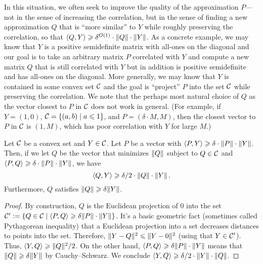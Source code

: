 In this situation, we often seek to improve the quality of the approximation $P$---not in the sense of increasing the correlation, but in the sense of finding a new approximation $Q$ that is ``more similar'' to $Y$ while roughly preserving the correlation, so that $\langle Q,Y\rangle\geqslant \delta^{O(1)}\cdot \lVert Q\rVert\cdot \lVert Y\rVert$.
As a concrete example, we may know that $Y$ is a positive semidefinite matrix with all-ones on the diagonal and our goal is to take an arbitrary matrix $P$ correlated with $Y$ and compute a new matrix $Q$ that is still correlated with $Y$ but in addition is positive semidefinite and has all-ones on the diagonal.
More generally, we may know that $Y$ is contained in some convex set $\mathcal C$ and the goal is ``project'' $P$ into the set $\mathcal C$ while preserving the correlation.
We note that the perhaps  most natural choice of $Q$ as the vector closest to $P$ in $\mathcal C$ does not work in general.
(For example, if $Y=(1,0)$, $\mathcal C=\{(a,b)\mid a\leqslant 1\}$, and $P=(\delta\cdot M, M)$, then the closest vector to $P$ in $\mathcal C$ is $(1,M)$, which has poor correlation with $Y$ for large $M$.)

\begin{theorem}
  \label{thm:correlation-preserving-projection}
  Let $\mathcal C$ be a convex set and $Y\in \mathcal C$.
  Let $P$ be a vector with $\langle P,Y\rangle\geqslant \delta \cdot \lVert P\rVert\cdot \lVert Y\rVert$.
  Then, if we let $Q$ be the vector that minimizes $\lVert Q\rVert$ subject to $Q\in \mathcal C$ and $\langle P,Q\rangle\geqslant \delta \cdot \lVert P\rVert\cdot \lVert Y\rVert$, we have
  \begin{equation}
    \langle Q,Y\rangle\geqslant \delta/2 \cdot \lVert Q\rVert\cdot \lVert Y\rVert\,.
  \end{equation}
  Furthermore, $Q$ satisfies $\lVert Q\rVert\geqslant \delta \lVert Y\rVert$.
\end{theorem}
\begin{proof}
  By construction, $Q$ is the Euclidean projection of $0$ into the set $\mathcal C'\mathrel{\mathop:}= \{Q \in \mathcal C \mid \langle P,Q\rangle\geqslant \delta \lVert P\rVert\cdot \lVert Y\rVert\}$.
  It's a basic geometric fact (sometimes called Pythagorean inequality) that a Euclidean projection into a set decreases distances to points into the set.
  Therefore, $\lVert Y-Q\rVert^2\leqslant \lVert Y-0\rVert^2$ (using that $Y\in \mathcal C'$).
  Thus, $\langle Y,Q\rangle\geqslant \lVert Q\rVert^2/2$.
  On the other hand, $\langle P,Q\rangle\geqslant \delta \lVert P\rVert\cdot \lVert Y\rVert$ means that $\lVert Q\rVert\geqslant \delta \lVert Y\rVert$ by Cauchy--Schwarz.
  We conclude $\langle Y,Q\rangle\geqslant \delta/2 \cdot \lVert Y\rVert\cdot \lVert Q\rVert$.
\end{proof}

